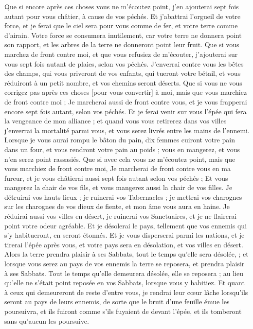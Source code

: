 \begin{multicols}{2}
Que si encore après ces choses vous ne m'écoutez point, j'en ajouterai sept fois autant pour vous châtier, à cause de vos péchés.
Et j'abattrai l'orgueil de votre force, et je ferai que le ciel sera pour vous comme de fer, et votre terre comme d'airain.
Votre force se consumera inutilement, car votre terre ne donnera point son rapport, et les arbres de la terre ne donneront point leur fruit.
Que si vous marchez de front contre moi, et que vous refusiez de m'écouter, j'ajouterai sur vous sept fois autant de plaies, selon vos péchés.
J'enverrai contre vous les bêtes des champs, qui vous priveront de vos enfants, qui tueront votre bétail, et vous réduiront à un petit nombre, et vos chemins seront déserts.
Que si vous ne vous corrigez pas après ces choses [pour vous convertir] à moi, mais que vous marchiez de front contre moi ;
Je marcherai aussi de front contre vous, et je vous frapperai encore sept fois autant, selon vos péchés.
Et je ferai venir sur vous l'épée qui fera la vengeance de mon alliance ; et quand vous vous retirerez dans vos villes j'enverrai la mortalité parmi vous, et vous serez livrés entre les mains de l'ennemi.
Lorsque je vous aurai rompu le bâton du pain, dix femmes cuiront votre pain dans un four, et vous rendront votre pain au poids ; vous en mangerez, et vous n'en serez point rassasiés.
Que si avec cela vous ne m'écoutez point, mais que vous marchiez de front contre moi,
Je marcherai de front contre vous en ma fureur, et je vous châtierai aussi sept fois autant selon vos péchés ;
Et vous mangerez la chair de vos fils, et vous mangerez aussi la chair de vos filles.
Je détruirai vos hauts lieux ; je ruinerai vos Tabernacles ; je mettrai vos charognes sur les charognes de vos dieux de fiente, et mon âme vous aura en haine.
Je réduirai aussi vos villes en désert, je ruinerai vos Sanctuaires, et je ne flairerai point votre odeur agréable.
Et je désolerai le pays, tellement que vos ennemis qui s'y habitueront, en seront étonnés.
Et je vous disperserai parmi les nations, et je tirerai l'épée après vous, et votre pays sera en désolation, et vos villes en désert.
Alors la terre prendra plaisir à ses Sabbats, tout le temps qu'elle sera désolée, ; et lorsque vous serez au pays de vos ennemis la terre se reposera, et prendra plaisir à ses Sabbats.
Tout le temps qu'elle demeurera désolée, elle se reposera ; au lieu qu'elle ne s'était point reposée en vos Sabbats, lorsque vous y habitiez.
Et quant à ceux qui demeureront de reste d'entre vous, je rendrai leur cœur lâche lorsqu'ils seront au pays de leurs ennemis, de sorte que le bruit d'une feuille émue les poursuivra, et ils fuiront comme s'ils fuyaient de devant l'épée, et ils tomberont sans qu'aucun les poursuive.

\end{multicols}
